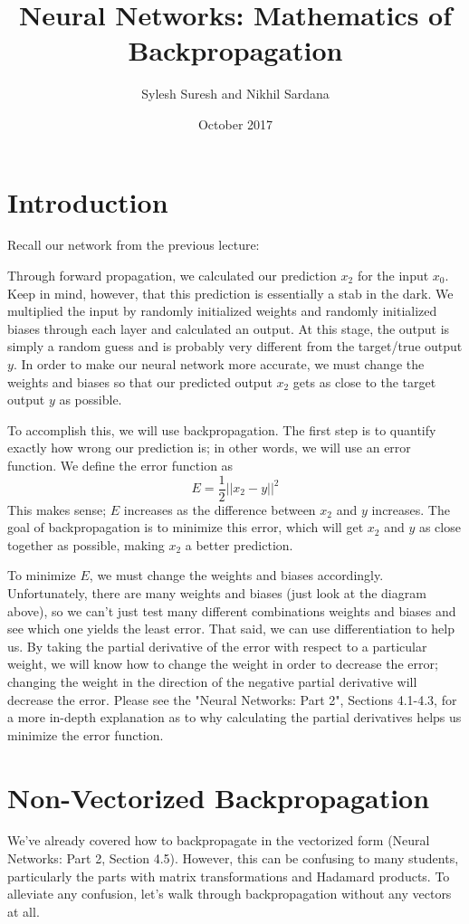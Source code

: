\documentclass{article}
\title{Neural Networks: Mathematics of Backpropagation}
\author{Sylesh Suresh and Nikhil Sardana}
\date{October 2017}
\begin{document}
\maketitle

\section{Introduction}
Recall our network from the previous lecture:

Through forward propagation, we calculated our prediction $x_2$ for the input $x_0$. Keep in mind, however, that this prediction is essentially a stab in the dark. We multiplied the input by randomly initialized weights and randomly initialized biases through each layer and calculated an output. At this stage, the output is simply a random guess and is probably very different from the target/true output $y$. In order to make our neural network more accurate, we must change the weights and biases so that our predicted output $x_2$ gets as close to the target output $y$ as possible.

To accomplish this, we will use backpropagation. The first step is to quantify exactly how wrong our prediction is; in other words, we will use an error function. We define the error function as \[E = \frac{1}{2}||x_2-y||^2\]
This makes sense; $E$ increases as the difference between $x_2$ and $y$ increases. The goal of backpropagation is to minimize this error, which will get $x_2$ and $y$ as close together as possible, making $x_2$ a better prediction.

To minimize $E$, we must change the weights and biases accordingly. Unfortunately, there are many weights and biases (just look at the diagram above), so we can’t just test many different combinations weights and biases and see which one yields the least error. That said, we can use differentiation to help us. By taking the partial derivative of the error with respect to a particular weight, we will know how to change the weight in order to decrease the error; changing the weight in the direction of the negative partial derivative will decrease the error. Please see the "Neural Networks: Part 2", Sections 4.1-4.3, for a more in-depth explanation as to why calculating the partial derivatives helps us minimize the error function.


\section{Non-Vectorized Backpropagation}
We've already covered how to backpropagate in the vectorized form (Neural Networks: Part 2, Section 4.5). However, this can be confusing to many students, particularly the parts with matrix transformations and Hadamard products. To alleviate any confusion, let's walk through backpropagation without any vectors at all.
\end{document}
